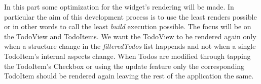 
In this part some optimization for the widget's rendering will be made. In particular the aim of this development process is to use the least renders possible or in other words to call the least \textit{build} execution possible. The focus will be on the TodoView and TodoItems. We want the TodoView to be rendered again only when a structure change in the \textit{filteredTodos} list happends and not when a single TodoItem’s internal aspects change. When Todos are modified through tapping the TodoItem's Checkbox or using the update feature only the corresponding TodoItem should be rendered again leaving the rest of the application the same. 
